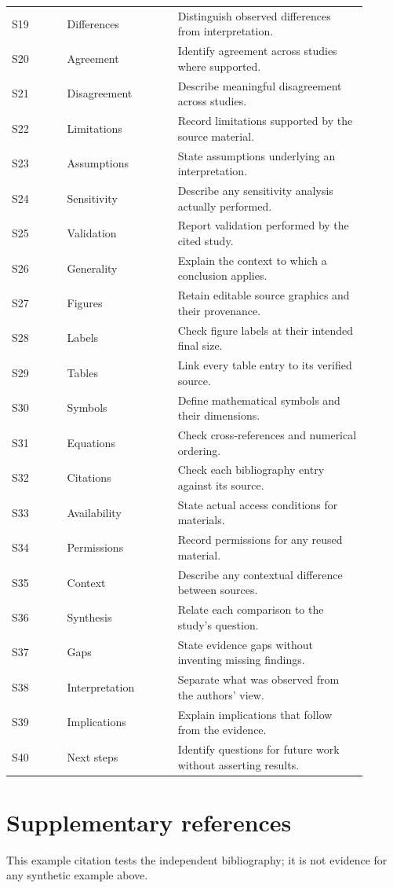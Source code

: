 \documentclass[11pt,letterpaper]{article}
\begin{document}
\begin{longtable}{@{}p{0.14\linewidth}p{0.28\linewidth}p{0.48\linewidth}@{}}
S19 & Differences & Distinguish observed differences from interpretation.\\
S20 & Agreement & Identify agreement across studies where supported.\\
S21 & Disagreement & Describe meaningful disagreement across studies.\\
S22 & Limitations & Record limitations supported by the source material.\\
S23 & Assumptions & State assumptions underlying an interpretation.\\
S24 & Sensitivity & Describe any sensitivity analysis actually performed.\\
S25 & Validation & Report validation performed by the cited study.\\
S26 & Generality & Explain the context to which a conclusion applies.\\
S27 & Figures & Retain editable source graphics and their provenance.\\
S28 & Labels & Check figure labels at their intended final size.\\
S29 & Tables & Link every table entry to its verified source.\\
S30 & Symbols & Define mathematical symbols and their dimensions.\\
S31 & Equations & Check cross-references and numerical ordering.\\
S32 & Citations & Check each bibliography entry against its source.\\
S33 & Availability & State actual access conditions for materials.\\
S34 & Permissions & Record permissions for any reused material.\\
S35 & Context & Describe any contextual difference between sources.\\
S36 & Synthesis & Relate each comparison to the study's question.\\
S37 & Gaps & State evidence gaps without inventing missing findings.\\
S38 & Interpretation & Separate what was observed from the authors' view.\\
S39 & Implications & Explain implications that follow from the evidence.\\
S40 & Next steps & Identify questions for future work without asserting results.\\
\end{longtable}
\normalsize

\section{Supplementary references}
This example citation tests the independent bibliography\cite{wilkinson2016fair};
it is not evidence for any synthetic example above.


\end{document}
